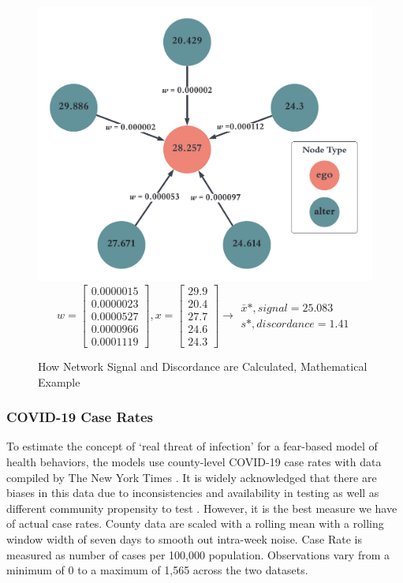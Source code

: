 \begin{figure}
\begin{center}\includegraphics[width=0.5\linewidth,]{figs/paper3/discordancenetwork-1.pdf} 
  \begin{equation}
    w = \begin{bmatrix}0.0000015\\0.0000023\\0.0000527\\0.0000966\\0.0001119\end{bmatrix},  
    x = \begin{bmatrix}29.9\\20.4\\27.7\\24.6\\24.3\end{bmatrix} \longrightarrow
    \begin{matrix} \bar{x}*, signal = 25.083\\ s*, discordance = 1.41 \end{matrix} 
  \end{equation}
  \caption{How Network Signal and Discordance are Calculated, Mathematical Example}
  \label{fig:discordancenetwork}
  \end{center}
\end{figure}

\hypertarget{COVID-19-case-rates}{%
\subsubsection{COVID-19 Case Rates}\label{COVID-19-case-rates}}

To estimate the concept of `real threat of infection' for a fear-based model of
health behaviors, the models use county-level COVID-19 case rates with
data compiled by The New York Times \citeyearpar{covid_data}. It is widely acknowledged that there are biases in this data due to inconsistencies and availability in testing as well as
different community propensity to test \citep{gu22, cdc20a}. However, it is the best
measure we have of actual case rates. County data are scaled with a rolling mean
with a rolling window width of seven days to smooth out intra-week noise. Case
Rate is measured as number of cases per 100,000 population. Observations vary
from a minimum of 0 to a maximum of 1,565 across the two datasets.

